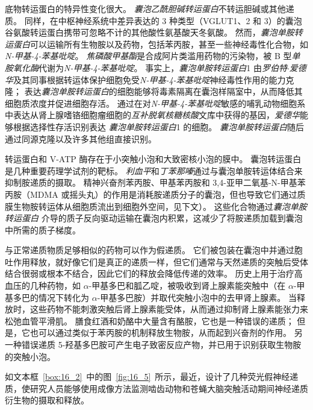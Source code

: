 底物转运蛋白的特异性变化很大。
\textit{囊泡乙酰胆碱转运蛋白}不转运胆碱或其他递质。
同样，在中枢神经系统中差异表达的 3 种类型（VGLUT1、2 和 3）的囊泡谷氨酸转运蛋白携带可忽略不计的其他酸性氨基酸天冬氨酸。
然而，\textit{囊泡单胺转运蛋白}可以运输所有生物胺以及药物，包括苯丙胺，甚至一些神经毒性化合物，如\textit{N-甲基-4-苯基吡啶}。
\textit{焦磷酸甲基酯}是合成阿片类滥用药物的污染物，被 B 型\textit{单胺氧化酶}代谢为\textit{N-甲基-4-苯基吡啶}。
事实上，\textit{囊泡单胺转运蛋白}1 由\textit{罗伯特$\cdot$爱德华}及其同事根据转运体保护细胞免受\textit{N-甲基-4-苯基吡啶}神经毒性作用的能力克隆；
表达\textit{囊泡单胺转运蛋白}的细胞能够将毒素隔离在囊泡样隔室中，从而降低其细胞质浓度并促进细胞存活。
通过在对\textit{N-甲基-4-苯基吡啶}敏感的哺乳动物细胞系中表达从肾上腺嗜铬细胞瘤细胞的\textit{互补脱氧核糖核酸}文库中获得的基因，\textit{爱德华}能够根据选择性存活识别表达 \textit{囊泡单胺转运蛋白}1 的细胞。
\textit{囊泡单胺转运蛋白}随后通过同源克隆以及许多其他组直接识别。


转运蛋白和 V-ATP 酶存在于小突触小泡和大致密核小泡的膜中。
囊泡转运蛋白是几种重要药理学试剂的靶标。
\textit{利血平}和\textit{丁苯那嗪}通过与囊泡单胺转运体结合来抑制胺递质的摄取。
精神兴奋剂苯丙胺、甲基苯丙胺和 3,4-亚甲二氧基-N-甲基苯丙胺（MDMA 或摇头丸）的作用是消耗胺递质分子的囊泡，但也导致它们通过质膜生物胺转运体从细胞质流出到细胞外空间，见下文）。
这些化合物通过\textit{囊泡单胺转运蛋白} 介导的质子反向驱动运输在囊泡内积累，这减少了将胺递质加载到囊泡中所需的质子梯度。


与正常递质物质足够相似的药物可以作为假递质。
它们被包装在囊泡中并通过胞吐作用释放，就好像它们是真正的递质一样，但它们通常与天然递质的突触后受体结合很弱或根本不结合，因此它们的释放会降低传递的效率。
历史上用于治疗高血压的几种药物，如 $\alpha$-甲基多巴和胍乙啶，被吸收到肾上腺素能突触中（在 $\alpha$-甲基多巴的情况下转化为 $\alpha$-甲基多巴胺）并取代突触小泡中的去甲肾上腺素。
当释放时，这些药物不能刺激突触后肾上腺素能受体，从而通过抑制肾上腺素能张力来松弛血管平滑肌。
膳食红酒和奶酪中大量含有酪胺，它也是一种错误的递质；
但是，它也可以通过类似于苯丙胺的机制释放生物胺，从而起到兴奋剂的作用。
另一种错误递质 5-羟基多巴胺可产生电子致密反应产物，并已用于识别获取生物胺的突触小泡。


如文本框~\ref{box:16_2}~中的图~\ref{fig:16_5}~所示，最近，设计了几种荧光假神经递质，使研究人员能够使用成像方法监测啮齿动物和苍蝇大脑突触活动期间神经递质衍生物的摄取和释放。


